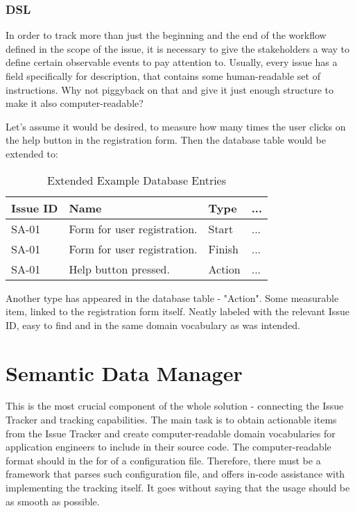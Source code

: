 \subsubsection{DSL}

In order to track more than just the beginning and the end of the workflow defined in the scope of the issue, it is necessary to give the stakeholders a way to define certain observable events to pay attention to. Usually, every issue has a field specifically for description, that contains some human-readable set of instructions. Why not piggyback on that and give it just enough structure to make it also computer-readable?

Let's assume it would be desired, to measure how many times the user clicks on the help button in the registration form. Then the database table would be extended to:

\bigbreak

\begin{table}[!ht]
\begin{center}
\begin{tabular}{|l|l|l|l|}
\hline
\textbf{Issue ID} & \textbf{Name} & \textbf{Type} & \textbf{...} \\
\hline
SA-01 & Form for user registration. & Start & ... \\
\hline
SA-01 & Form for user registration. & Finish & ... \\
\hline
SA-01 & Help button pressed. & Action & ...\\
\hline
\end{tabular}
\end{center}
\caption{Extended Example Database Entries}
\label{tab:ex_db2}
\end{table}

Another type has appeared in the database table - "Action". Some measurable item, linked to the registration form itself. Neatly labeled with the relevant Issue ID, easy to find and in the same domain vocabulary as was intended.

\section{Semantic Data Manager}

This is the most crucial component of the whole solution - connecting the Issue Tracker and tracking capabilities. The main task is to obtain actionable items from the Issue Tracker and create computer-readable domain vocabularies for application engineers to include in their source code. The computer-readable format should in the for of a configuration file. Therefore, there must be a framework that parses such configuration file, and offers in-code assistance with implementing the tracking itself. It goes without saying that the usage should be as smooth as possible.

